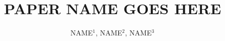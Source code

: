 \documentclass[final,authoryear,5p,times,twocolumn]{IEEEtran}
\begin{document}
\title{PAPER NAME GOES HERE}
\author{NAME$^{1}$, NAME$^{2}$, NAME$^{3}$}
\maketitle









\newpage




\end{document}
